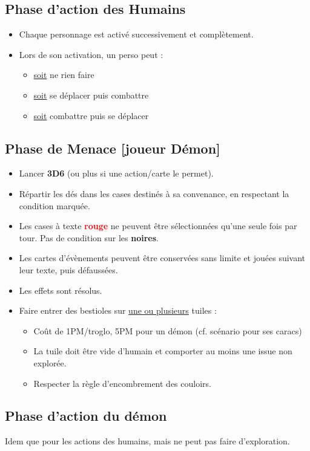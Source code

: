 \documentclass[10pt, a4paper]{article}	%
\begin{document}
\begin{multicols}{3}
\subsection{Phase d'action des Humains}
\begin{itemize}
\item Chaque personnage est activé successivement et complètement.
\item Lors de son activation, un perso peut :
\begin{itemize}
\item \underline{soit} ne rien faire
\item \underline{soit} se déplacer puis combattre
\item \underline{soit} combattre puis se déplacer
\end{itemize}
\end{itemize}



\subsection{Phase de Menace [joueur Démon]}
\begin{itemize}
\item Lancer \textbf{3D6} (ou plus si une action/carte le permet).
\item Répartir les dés dans les cases \og destinés\fg{} à sa convenance, en respectant la condition marquée.
\item Les cases à texte \textcolor{red}{\textbf{rouge}} ne peuvent être sélectionnées qu'une seule fois par tour. Pas de condition sur les \textbf{noires}.
\item Les cartes d'évènements peuvent être conservées sans limite et jouées suivant leur texte, puis défaussées.
\item Les effets sont résolus.
\item Faire entrer des bestioles sur \underline{une ou plusieurs} tuiles :
\begin{itemize}
	\item Coût de 1PM/troglo, 5PM pour un démon (cf. scénario pour ses caracs)
	\item La tuile doit être vide d'humain et comporter au moins une issue non explorée.
	\item Respecter la règle d'encombrement des couloirs.
\end{itemize}
\end{itemize}


\subsection{Phase d'action du démon}
Idem que pour les actions des humains, mais ne peut pas faire d'exploration.






\end{multicols}
\end{document}
